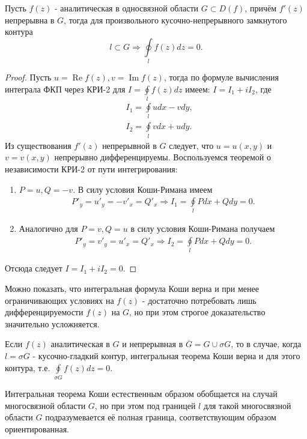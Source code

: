 \begin{theorem}
  Пусть $f(z)$ - аналитическая в односвязной области $G \subset D(f)$, причём $f'(z)$ непрерывна в
  $G$, тогда для произвольного кусочно-непрерывного замкнутого контура
  \begin{equation}
    l \subset G \Rightarrow \oint\limits_lf(z)dz = 0.
  \end{equation}
\end{theorem}
\begin{proof}
  Пусть $u = \operatorname{Re}f(z), v = \operatorname{Im}f(z)$, тогда по формуле вычисления интеграла
  ФКП через КРИ-2 для $I = \oint\limits_lf(z)dz$ имеем: $I = I_1 + iI_2$, где
  \begin{align*}
    &I_1 = \oint\limits_ludx -vdy,\\
    &I_2 = \oint\limits_lvdx + udy.
  \end{align*}
  Из существования $f'(z)$ непрерывной в $G$ следует, что $u = u(x, y)$ и $v = v(x, y)$ непрерывно
  дифференцируемы. Воспользуемся теоремой о независимости КРИ-2 от пути интегрирования:
  \begin{enumerate}
  \item $P = u, Q = -v$. В силу условия Коши-Римана имеем
    \begin{align*}
      P'_y = u'_y = -v'_x = Q'_x \Rightarrow I_1 = \oint\limits_lPdx + Qdy = 0.
    \end{align*}
  \item Аналогично для $P = v, Q = u$ в силу условия Коши-Римана получаем
    \begin{align*}
      P'_y = v'_y = u'_x = Q'_x \Rightarrow I_2 = \oint\limits_lPdx + Qdy = 0.
    \end{align*}
  \end{enumerate}
  Отсюда следует $I = I_1 + iI_2 = 0$.
\end{proof}
\begin{notes}
\item Можно показать, что интегральная формула Коши верна и при менее ограничивающих условиях на
  $f(z)$ - достаточно потребовать лишь дифференцируемости $f(z)$ на $G$, но при этом строгое
  доказательство значительно усложняется.
\item Если $f(z)$ аналитическая в $G$ и непрерывная в $\overline{G} = G \cup \sigma G$, то в случае,
  когда $l = \sigma G$ - кусочно-гладкий контур, интегральная теорема Коши верна и для этого контура,
  т.е. $\displaystyle{\oint\limits_{\sigma G}}f(z)dz = 0$.
\item Интегральная теорема Коши естественным образом обобщается на случай многосвязной области $G$,
  но при этом под границей $l$ для такой многосвязной области $G$ подразумевается её полная граница,
  соответствующим образом ориентированная.
\end{notes}
